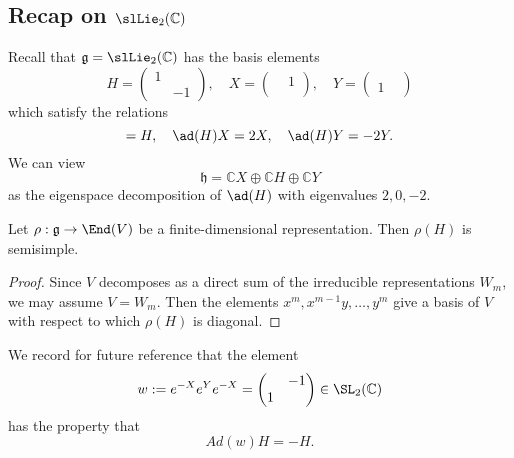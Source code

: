 \documentclass[reqno]{amsart} 
\begin{document}
\subsection{Recap on \texorpdfstring{$\slLie_2(\mathbb{C})$}{sl2C}}
\label{sec:org77c4374}
Recall that $\mathfrak{g} = \slLie_2(\mathbb{C})$ has the basis elements
\begin{equation*}
  H = 
\begin{pmatrix}
    1 &  \\
      & -1
  \end{pmatrix}
,
  \quad
  X = 
\begin{pmatrix}
    & 1 \\
    & 
  \end{pmatrix}
,
  \quad
  Y = 
\begin{pmatrix}
    &  \\
    1 & 
  \end{pmatrix}
\end{equation*}
which satisfy the relations
\begin{equation*}
 [X,Y] = H, \quad \ad(H) X = 2 X, \quad \ad(H) Y = -2 Y.
\end{equation*}
We can view
\begin{equation*}
  \mathfrak{h} = \mathbb{C} X \oplus \mathbb{C} H \oplus \mathbb{C} Y
\end{equation*}
as the eigenspace decomposition of $\ad(H)$ with eigenvalues $2, 0, -2$.

\begin{theorem}
  Let $\rho : \mathfrak{g} \rightarrow \End(V)$ be a finite-dimensional representation.  Then $\rho(H)$ is semisimple.
\end{theorem}
\begin{proof}
  Since $V$ decomposes as a direct sum of the irreducible representations $W_m$, we may assume $V = W_m$.  Then the elements $x^m, x^{m-1} y, \dotsc, y^m$ give a basis of $V$ with respect to which $\rho(H)$ is diagonal.
\end{proof}

We record for future reference that the element
\begin{equation}\label{eq:weyl-element-via-exponentials-sl2}
  w := e^{-X} e^Y e^{-X} = 
\begin{pmatrix}
    & -1 \\
    1 & 
  \end{pmatrix}
 \in \SL_2(\mathbb{C})
\end{equation}
has the property that
\begin{equation}\label{eq:weyl-element-via-expoenntials-sl2-acting-as-reflection}
  Ad(w) H = - H.
\end{equation}
\end{document}
